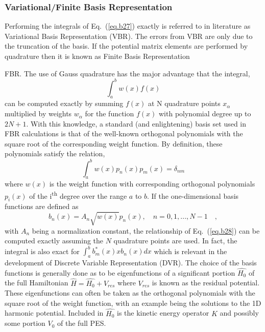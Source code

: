 \subsubsection{Variational/Finite Basis Representation}
Performing the integrals of Eq.~(\ref{eq.b27}) exactly is referred to in literature as Variational Basis Representation (VBR)\cite{Light2000}. The errors from VBR are only due to the truncation of the basis.  If the potential matrix elements are performed by quadrature then it is known as Finite Basis Representation {FBR.  The use of Gauss quadrature has the major advantage that the integral,
\begin{equation}\label{eq.b30}
\int_a^b w\left(x\right) f\left(x\right)
\end{equation}
 can be computed exactly by summing $f\left(x\right)$ at N quadrature points $x_{\alpha}$ multiplied by weights $w_{\alpha}$ for the function $f\left(x\right)$ with polynomial degree up to $2N+1$.  With this knowledge, a standard (and enlightening) basis set used in FBR calculations is that of the well-known orthogonal polynomials with the square root of the corresponding weight function.  By definition, these polynomials satisfy the relation,
\begin{equation}\label{eq.b28}
\int_{a}^{b} w\left(x\right)p_n\left(x\right)p_m\left(x\right)=\delta_{nm}
\end{equation}
where $w\left(x\right)$ is the weight function with corresponding orthogonal polynomials $p_i\left(x\right)$ of the i\textsuperscript{th} degree over the range $a$ to $b$. If the one-dimensional basis functions are defined as
\begin{equation}\label{eq.b29}
b_n\left(x\right)=A_n \sqrt{w\left(x\right)}p_n\left(x\right), \quad n=0,1,...,N-1\quad ,
\end{equation}
with $A_n$ being a normalization constant, the relationship of Eq.~(\ref{eq.b28}) can be computed exactly assuming the $N$ quadrature points are used. In fact, the integral is also exact for $\int_a^b b_m^{*}\left(x\right) x b_n\left(x\right)dx$ which is relevant in the development of Discrete Variable Representation (DVR).\cite{Light2000}   The choice of the basis functions is generally done as to be eigenfunctions of a significant portion $\hat{H_0}$ of the full Hamiltonian $\hat{H}=\hat{H_0}+V_{res}$ where $V_{res}$ is known as the residual potential.  These eigenfunctions can often be taken as the orthogonal polynomials with the square root of the weight function, with an example being the solutions to the 1D harmonic potential.  Included in $\hat{H_0}$ is the kinetic energy operator $K$ and possibly some portion $V_0$ of the full PES.  

}
